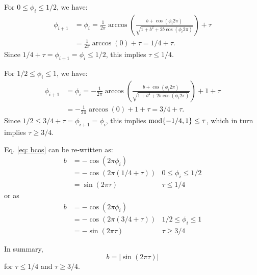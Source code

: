 \noindent For $0 \leq \phi_i \leq 1/2$, we have: \begin{align}
    \phi_{i+1} &= \phi_i = \frac{1}{2\pi}\arccos(\frac{b+\cos(\phi_i 2\pi)}{\sqrt{1+b^2+2b\cos(\phi_i 2\pi)}}) + \tau \\
    &= \frac{1}{2\pi}\arccos(0) + \tau = 1/4 +\tau.
\end{align} 
Since $1/4 + \tau = \phi_{i+1} = \phi_i \leq 1/2$, this implies $\tau \leq 1/4$.
    
\noindent For $1/2 \leq \phi_i \leq 1$, we have:
\begin{align}
    \phi_{i+1} &= \phi_i = -\frac{1}{2\pi}\arccos(\frac{b+\cos(\phi_i 2\pi)}{\sqrt{1+b^2+2b\cos(\phi_i 2\pi)}}) + 1 + \tau\\ 
    &= -\frac{1}{2\pi}\arccos(0) + 1 + \tau = 3/4 +\tau.
\end{align} 
Since $1/2 \leq 3/4 + \tau = \phi_{i+1} = \phi_i $, this implies $\textnormal{mod} \{-1/4,1\} \leq \tau$, which in turn implies $\tau \geq 3/4$. 

\noindent Eq. \ref{eq: bcos} can be re-written as:
\begin{align}
    b&= -\cos(2\pi \phi_i) \nonumber \\
    &= -\cos(2\pi(1/4 +\tau)) & 0 \leq \phi_i \leq 1/2 \nonumber \\
    &= \sin(2\pi\tau) & \tau \leq 1/4
\end{align} or as
\begin{align}
b&= -\cos(2\pi \phi_i) \nonumber \\
&= -\cos(2\pi(3/4 +\tau)) & 1/2 \leq \phi_i \leq 1 \nonumber \\
&= -\sin(2\pi\tau) & \tau \geq 3/4
\end{align}

\noindent In summary, 
\begin{equation}
    b = |\sin(2\pi\tau)| 
    \label{eq:bound1} 
\end{equation} for $\tau \leq 1/4$ and $\tau \geq 3/4$.\\

